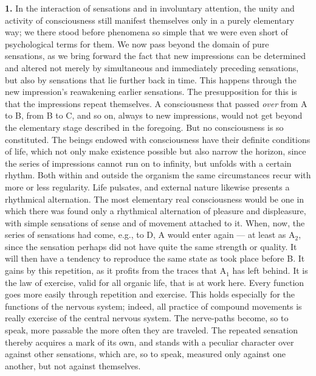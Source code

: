 \documentclass[12pt,a4paper]{book}
\newcommand{\opage}[1]{\marginnote{\footnotesize\textit{[#1]}}}
\begin{document}
\textbf{1.} In the interaction of sensations and in involuntary attention,
the unity and activity of consciousness still manifest themselves only in a
purely elementary way; we there stood before phenomena so simple that we
were even short of psychological terms for them. We now pass beyond the
domain of pure sensations, as we bring forward the fact that new
impressions can be determined and altered not merely by simultaneous and
immediately preceding sensations, but also by sensations that lie further
back in time. This happens through the new impression's reawakening
earlier sensations. The presupposition for this is that the impressions
repeat themselves. A consciousness that passed \emph{over} from A to B,
from B to C, and so on, always to new impressions, would not get beyond the
elementary stage described in the foregoing. But no consciousness is so
constituted. The beings endowed with consciousness have their definite
conditions of life, which not only make existence possible but also narrow
the horizon, since the series of impressions cannot run on to infinity,
but unfolds with a certain rhythm. Both within and outside the organism the
same circumstances recur with more or less regularity. Life pulsates, and
external nature likewise presents a rhythmical alternation. The most
elementary real consciousness would be one in which there was found only a
rhythmical alternation of pleasure and displeasure, with simple sensations
of sense and of movement attached to it. When, now, the series of
sensations had come, e.g., to D, A would enter again --- at least as
A$_{2}$, since the sensation perhaps did not have quite the same strength
or quality. It will then
\opage{151}have a tendency to reproduce the same state as took place
before B. It gains by this repetition, as it profits from the traces that
A$_{1}$ has left behind. It is the law of exercise, valid for all organic
life, that is at work here. Every function goes more easily through
repetition and exercise. This holds especially for the functions of the
nervous system; indeed, all practice of compound movements is really
exercise of the central nervous system. The nerve-paths become, so to
speak, more passable the more often they are traveled. The repeated
sensation thereby acquires a mark of its own, and stands with a peculiar
character over against other sensations, which are, so to speak, measured
only against one another, but not against themselves.
\end{document}
